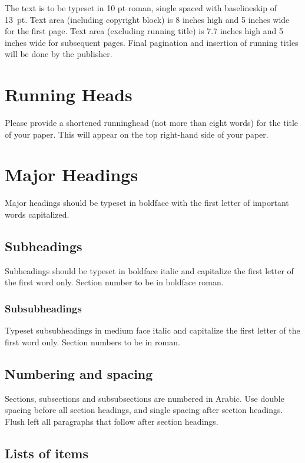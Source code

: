 \documentclass{ws-ijmpa}
\begin{document}
The text is to be typeset in 10 pt roman, single spaced with
baselineskip of 13~pt. Text area (including copyright block)
is 8 inches high and 5 inches wide for the first page.  Text area
(excluding running title) is 7.7 inches high and 5 inches wide for
subsequent pages.  Final pagination and insertion of running titles
will be done by the publisher.

\section{Running Heads}

Please provide a shortened runninghead (not more than eight words) for
the title of your paper. This will appear on the top right-hand side
of your paper.

\section{Major Headings}

Major headings should be typeset in boldface with the first
letter of important words capitalized.

\subsection{Subheadings}

Subheadings should be typeset in boldface italic and capitalize
the first letter of the first word only. Section number to be in
boldface roman.

\subsubsection{Subsubheadings}

Typeset subsubheadings in medium face italic and capitalize the
first letter of the first word only. Section numbers to be in
roman.

\subsection{Numbering and spacing}

Sections, subsections and subsubsections are numbered in
Arabic.  Use double spacing before all section headings, and
single spacing after section headings. Flush left all paragraphs
that follow after section headings.

\subsection{Lists of items}
\end{document}
